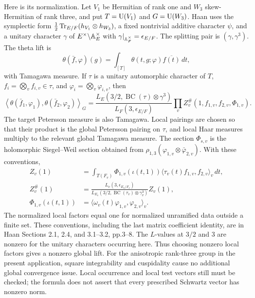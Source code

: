 \documentclass[11pt]{article}
\theoremstyle{definition}\newtheorem{definition}[theorem]{Definition}\newtheorem{remark}[theorem]{Remark}
\begin{document}
Here is its normalization. Let $V_1$ be Hermitian of rank one and $W_3$
skew-Hermitian of rank three, and put $T=\operatorname{U}(V_1)$ and $G=\operatorname{U}(W_3)$.
Haan uses the symplectic form
$\frac12\operatorname{Tr}_{E/F}(h_{V_1}\otimes h_{W_3})$, a fixed nontrivial additive
character $\psi$, and a unitary character $\gamma$ of
$E^\times\backslash\mathbb A_E^\times$ with
$\gamma|_{\mathbb A_F^\times}=\epsilon_{E/F}$. The splitting pair is
$(\gamma,\gamma^3)$. The theta lift is
\[
 \theta(\bar f,\varphi)(g)
 =\int_{[T]}\theta(t,g;\varphi)\overline{f(t)}\,dt,
\]
with Tamagawa measure. If $\tau$ is a unitary automorphic character of
$T$, $f_i=\bigotimes_v f_{i,v}\in\tau$, and
$\varphi_i=\bigotimes_v\varphi_{i,v}$, then
\begin{equation}\label{A-Rallis}
 \left\langle\theta(\bar f_1,\varphi_1),
                    \theta(\bar f_2,\varphi_2)\right\rangle_G
 =\frac{L_E(3/2,\operatorname{BC}(\tau)\otimes\gamma^3)}
        {L_F(3,\epsilon_{E/F})}
       \prod_v Z_v^{\#}(1,f_{1,v},f_{2,v},\Phi_{1,v}).
\end{equation}
The target Petersson measure is also Tamagawa. Local pairings are
chosen so that their product is the global Petersson pairing on
$\tau$, and local Haar measures multiply to the relevant global
Tamagawa measure. The section $\Phi_{s,v}$ is the holomorphic
Siegel--Weil section obtained from
$\rho_{1,3}(\varphi_{1,v}\otimes\bar\varphi_{2,v})$. With these
conventions,
\[
\begin{split}
 Z_v(1)&=\int_{T(F_v)}\Phi_{1,v}(\iota(t,1))
               \langle\tau_v(t)f_{1,v},f_{2,v}\rangle_v\,dt,\\
 Z_v^{\#}(1)&=
 \frac{L_v(3,\epsilon_{E_v/F_v})}
 {L_{E_v}(3/2,\operatorname{BC}(\tau_v)\otimes\gamma_v^3)}Z_v(1),\\
 \Phi_{1,v}(\iota(t,1))&=
       \langle\omega_v(t)\varphi_{1,v},\varphi_{2,v}\rangle_v.
\end{split}
\]
The normalized local factors equal one for normalized unramified data
outside a finite set. These conventions, including the last matrix
coefficient identity, are in Haan Sections 2.1, 2.4, and 3.1--3.2,
pp.3--8. The $L$-values at $3/2$ and $3$ are nonzero for the unitary
characters occurring here. Thus choosing nonzero local factors gives a
nonzero global lift. For the anisotropic rank-three group in the present
application, square integrability and cuspidality cause no additional
global convergence issue. Local occurrence and local test vectors still
must be checked; the formula does not assert that every prescribed
Schwartz vector has nonzero norm.
\end{document}
